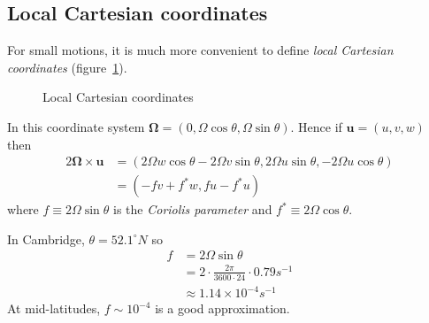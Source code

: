 \documentclass{jknotes}
\begin{document}
\subsection{Local Cartesian coordinates}
For small motions, it is much more convenient to define \emph{local Cartesian
coordinates} (figure~\ref{fig:lcc}).
\begin{figure}
	\begin{center}
	\caption{Local Cartesian coordinates}
	\label{fig:lcc}
	\end{center}
\end{figure}

In this coordinate system $\bm{\Omega} = (0, \Omega \cos \theta, \Omega \sin
\theta)$. Hence if $\bm{u} = (u, v, w)$ then
\begin{equation}
	\begin{aligned}
		2 \bm{\Omega} \times \bm{u} &= (2\Omega w \cos \theta - 2 \Omega v \sin
		\theta, 2 \Omega u \sin \theta, -2\Omega u \cos \theta) \\
		&= (-fv + f^* w, fu - f^* u)
	\end{aligned}
\end{equation}
where $f \equiv 2 \Omega \sin \theta$ is the \emph{Coriolis parameter} and
$f^* \equiv 2 \Omega \cos \theta$.

\begin{eg}
	In Cambridge, $\theta = 52.1^{\circ} N$ so
	\begin{equation}
		\begin{aligned}
			f &= 2 \Omega \sin \theta \\
			  &= 2 \cdot \frac{2\pi}{3600 \cdot 24} \cdot 0.79 s^{-1} \\
			  &\approx 1.14 \times 10^{-4} s^{-1}
		\end{aligned}
	\end{equation}
	At mid-latitudes, $f \sim 10^{-4}$ is a good approximation.
\end{eg}
\end{document}
